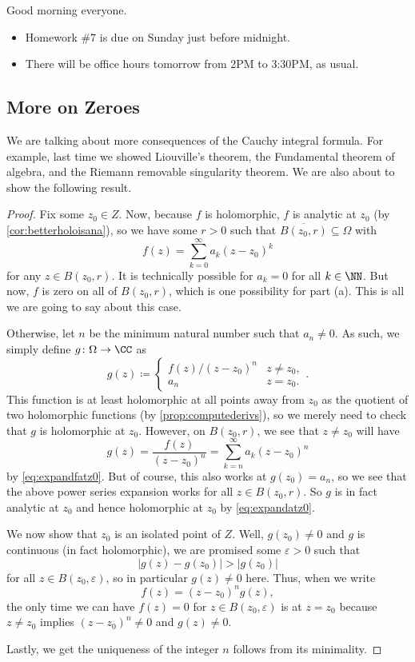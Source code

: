 \documentclass[../notes.tex]{subfiles}
\begin{document}

Good morning everyone.
\begin{itemize}
	\item Homework \#7 is due on Sunday just before midnight.
	\item There will be office hours tomorrow from 2PM to 3:30PM, as usual.
\end{itemize}

\subsection{More on Zeroes}
We are talking about more consequences of the Cauchy integral formula. For example, last time we showed Liouville's theorem, the Fundamental theorem of algebra, and the Riemann removable singularity theorem. We are also about to show the following result.
\isolatezeroes*
\begin{proof}
	Fix some $z_0\in Z$. Now, because $f$ is holomorphic, $f$ is analytic at $z_0$ (by \autoref{cor:betterholoisana}), so we have some $r>0$ such that $\overline{B(z_0,r)}\subseteq\Omega$ with
	\[f(z)=\sum_{k=0}^\infty a_k(z-z_0)^k\tag{$*$}\label{eq:expandfatz0}\]
	for any $z\in B(z_0,r)$. It is technically possible for $a_k=0$ for all $k\in\NN$. But now, $f$ is zero on all of $B(z_0,r)$, which is one possibility for part (a). This is all we are going to say about this case.
	
	Otherwise, let $n$ be the minimum natural number such that $a_n\ne0$. As such, we simply define $g\colon\Omega \to\CC$ as
	\[g(z)\coloneqq \begin{cases}
		f(z)/(z-z_0)^n & z\ne z_0, \\
		a_n & z=z_0.
	\end{cases}.\]
	This function is at least holomorphic at all points away from $z_0$ as the quotient of two holomorphic functions (by \autoref{prop:computederivs}), so we merely need to check that $g$ is holomorphic at $z_0$. However, on $B(z_0,r)$, we see that $z\ne z_0$ will have
	\[g(z)=\frac{f(z)}{(z-z_0)^n}=\sum_{k=n}^\infty a_k(z-z_0)^n\]
	by \autoref{eq:expandfatz0}. But of course, this also works at $g(z_0)=a_n$, so we see that the above power series expansion works for all $z\in B(z_0,r)$. So $g$ is in fact analytic at $z_0$ and hence holomorphic at $z_0$ by \autoref{eq:expandatz0}.

	We now show that $z_0$ is an isolated point of $Z$. Well, $g(z_0)\ne0$ and $g$ is continuous (in fact holomorphic), we are promised some $\varepsilon>0$ such that
	\[|g(z)-g(z_0)|>|g(z_0)|\]
	for all $z\in B(z_0,\varepsilon)$, so in particular $g(z)\ne0$ here. Thus, when we write
	\[f(z)=(z-z_0)^ng(z),\]
	the only time we can have $f(z)=0$ for $z\in B(z_0,\varepsilon)$ is at $z=z_0$ because $z\ne z_0$ implies $(z-z_0)^n\ne0$ and $g(z)\ne0$.

	Lastly, we get the uniqueness of the integer $n$ follows from its minimality. %
\end{proof}
\end{document}
